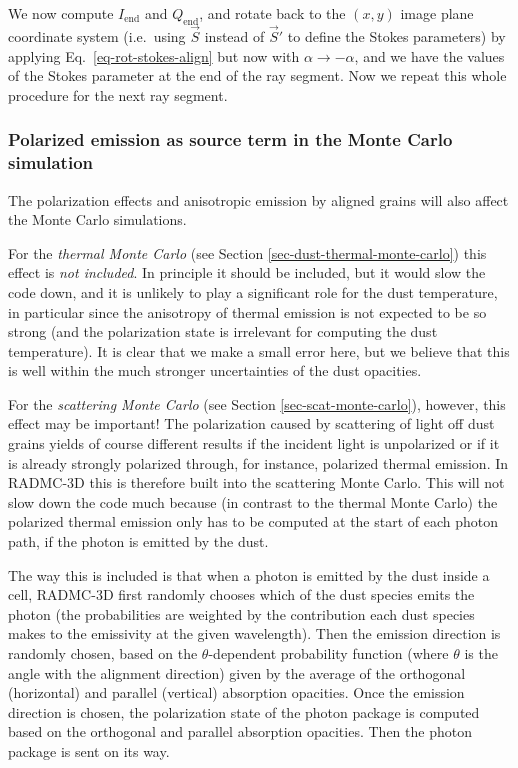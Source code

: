 \documentclass{report}
\begin{document}
We now compute $I_{\mathrm{end}}$ and $Q_{\mathrm{end}}$, and rotate back to
the $(x,y)$ image plane coordinate system (i.e.~using $\vec S$ instead of
$\vec S'$ to define the Stokes parameters) by applying
Eq.~\ref{eq-rot-stokes-align} but now with $\alpha\rightarrow -\alpha$, and
we have the values of the Stokes parameter at the end of the ray
segment. Now we repeat this whole procedure for the next ray segment.


\subsubsection{Polarized emission as source term in the Monte Carlo simulation}
The polarization effects and anisotropic emission by aligned grains will
also affect the Monte Carlo simulations.

For the {\em thermal Monte Carlo} (see Section
\ref{sec-dust-thermal-monte-carlo}) this effect is {\em not included}. In
principle it should be included, but it would slow the code down, and it is
unlikely to play a significant role for the dust temperature, in particular
since the anisotropy of thermal emission is not expected to be so strong
(and the polarization state is irrelevant for computing the dust
temperature). It is clear that we make a small error here, but we believe
that this is well within the much stronger uncertainties of the dust
opacities.

For the {\em scattering Monte Carlo} (see Section
\ref{sec-scat-monte-carlo}), however, this effect may be important! The
polarization caused by scattering of light off dust grains yields of
course different results if the incident light is unpolarized or if it
is already strongly polarized through, for instance, polarized thermal
emission. In RADMC-3D this is therefore built into the scattering
Monte Carlo. This will not slow down the code much because (in contrast
to the thermal Monte Carlo) the polarized thermal emission only has to
be computed at the start of each photon path, if the photon is emitted
by the dust. 

The way this is included is that when a photon is emitted by the dust inside
a cell, RADMC-3D first randomly chooses which of the dust species emits the
photon (the probabilities are weighted by the contribution each dust species
makes to the emissivity at the given wavelength).  Then the emission
direction is randomly chosen, based on the $\theta$-dependent probability
function (where $\theta$ is the angle with the alignment direction) given by
the average of the orthogonal (horizontal) and parallel (vertical) absorption
opacities. Once the emission direction is chosen, the polarization state of
the photon package is computed based on the orthogonal and parallel
absorption opacities. Then the photon package is sent on its way.
\end{document}
